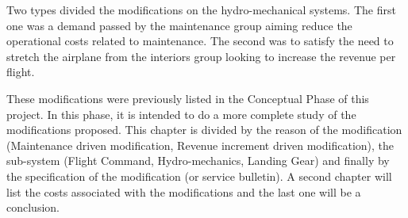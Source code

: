 Two types divided the modifications on the hydro-mechanical systems. The first one was a demand passed by the maintenance group aiming reduce the operational costs related to maintenance. The second was to satisfy the need to stretch the airplane from the interiors group looking to increase the revenue per flight.

These modifications were previously listed in the Conceptual Phase of this project. In this phase, it is intended to do a more complete study of the modifications proposed. This chapter is divided by the reason of the modification (Maintenance driven modification, Revenue increment driven modification), the sub-system (Flight Command, Hydro-mechanics, Landing Gear) and finally by the specification of the modification (or service bulletin). A second chapter will list the costs associated with the modifications and the last one will be a conclusion.
